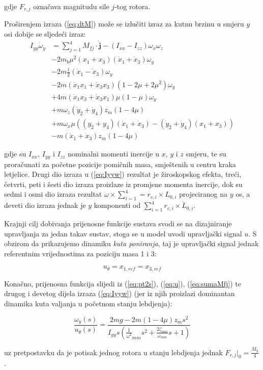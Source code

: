 \documentclass[11pt,a4paper]{article}
\begin{document}
gdje $F_{r,j}$ označava magnitudu sile $j$-tog rotora. 

\medskip

Proširenjem izraza (\ref{eq:dtM}) može se izlučiti izraz za kutnu brzinu u smjeru $y$ osi dobije se sljedeći izraz:
\begin{equation}
\begin{split}
I_{yy}\dot{\omega}_{y}  & = \sum_{j=1}^{4}M_{fj}\cdot  \bm{\hat{j}} - (I_{xx} - I_{zz})\omega_{x}\omega_{z} \\
&- 2m_{b}\mu^{2}(x_{1} + x_{3})(\dot{x}_{1} + \dot{x}_{3} )\omega_{y} \\
&- 2m\frac{l}{2}(\dot{x}_{1} - \dot{x}_{3})\omega_{y} \\
&- 2m(\dot{x}_{1}x_{1} + \dot{x}_{3}x_{3})(1-2\mu + 2\mu^{2})\omega_{y} \\
&+ 4m(\dot{x}_{1}x_{3} + \dot{x}_{3}x_{1})\mu(1-\mu)\omega_{y} \\
&+ m \omega_{z}(\dot{y}_{2} + \dot{y}_{4})z_{m}(1-4\mu) \\
&+ m\omega_{x}\mu ((y_{2} + y_{4})(\dot{x}_{1} + \dot{x}_{3})-(\dot{y}_{2} + \dot{y}_{4})(x_{1} + x_{3})) \\
&- m(\ddot{x}_{1} + \ddot{x}_{3})z_{m}(1 - 4\mu)
\end{split}
\label{eq:Iyyw}
\end{equation}

gdje su $I_{xx}$, $I_{yy}$ i $I_{zz}$ nominalni momenti inercije u $x$, $y$ i $z$ smjeru, te su proračunati za početne pozicije pomičnih masa, smještenih u centru kraka letjelice. Drugi dio izraza u (\ref{eq:Iyyw}) rezultat je žiroskopskog efekta, treći, četvrti, peti i šesti dio izraza proizlaze iz promjene momenta inercije, dok su sedmi i osmi dio izraza rezultat $\omega \times \sum_{i=1}^{4} = r_{c,i}\times L_{0,i}$ projeciranog na $y$ os, a deveti dio izraza jednak je $y$ komponenti od $\sum_{i=1}^{4}r_{c,i}\times \dot{L}_{0,i}$.  

\medskip

Krajnji cilj dobivanja prijenosne funkcije sustava svodi se na dizajniranje upravljanja za jedan takav sustav, stoga se u model uvodi upravljački signal $u$. S obzirom da prikazujemo dinamiku \textit{kuta poniranja}, taj je upravljački signal jednak referentnim vrijednostima za poziciju masa 1 i 3:

\begin{equation}
 u_{\theta} = x_{1, ref} = x_{3, ref}
 \label{eq:u}
 \end{equation} 

Konačno, prijenosna funkcija slijedi iz (\ref{eq:pt2s}), (\ref{eq:u}), (\ref{eq:sumaMfj}) te drugog i devetog dijela izraza (\ref{eq:Iyyw}) (jer iz njih proizlazi dominantan dinamika kuta valjanja u početnom stanju lebdjenja):

\begin{equation}
\boxed{
\frac{\omega_{y}(s)}{u_{\theta}(s)} = \frac{2mg - 2m(1-4\mu)z_{m}s^{2}}{I_{yy}s \left(\frac{1}{\omega^{2}}_{mm}s^{2} + \frac{2\zeta_{mm}}{\omega_{mm}}s + 1  \right)}
}
\label{eq:tf}
\end{equation}

uz pretpostavku da je potisak jednog rotora u stanju lebdjenja jednak $F_{r,j}|_{0} = \frac{M_{g}}{4}$.
\end{document}
